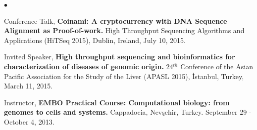 \documentclass[margin,line]{res}
\newenvironment{list2}{
  \begin{list}{$\bullet$}{%
      \setlength{\itemsep}{0.1cm}
      \setlength{\parsep}{0in} \setlength{\parskip}{0in}
      \setlength{\topsep}{0in} \setlength{\partopsep}{0in} 
      \setlength{\leftmargin}{0.2in}}}{\end{list}}
\newcommand{\junk}[1]{}
\begin{document}
\begin{resume}
\begin{list2}
{\item
  Conference Talk, 
  {\bf Coinami: A cryptocurrency with DNA Sequence Alignment as Proof-of-work.}
  High Throughput Sequencing Algorithms and Applications (HiTSeq 2015), Dublin, Ireland, July 10, 2015.
}


\junk{
\item
  Invited Speaker, 
  {\bf Discovery of large genomic inversions using pooled clone sequencing.}
  İzmir Biomedicine and Genome Center, Dokuz Eylül University, İzmir, Turkey, April 20, 2015.
  
  }
\item
  Invited Speaker, 
  {\bf High throughput sequencing and bioinformatics for characterization of diseases of genomic origin.}
  24$^{th}$ Conference of the Asian Pacific Association for the Study of the Liver (APASL 2015), İstanbul, Turkey, March 11, 2015.
  
\junk{
\item
  Invited Speaker, 
  {\bf Genetik Hastalıkların Karakterizasyonunda Yüksek Ölçekli Dizileme ve Biyoenformatik.} {\it (in Turkish)},
  İzmir Biomedicine and Genome Center, Dokuz Eylül University, İzmir, Turkey, October 8, 2014

\item
  Invited Speaker, 
  {\bf Characterization of  genome structural variation and large inversions using NGS.}
  IU Bioinformatics Clinic, July 17, 2014. 

\item
  Conference Talk, 
  {\bf Characterization of large inversions using pooled clone sequencing.}
  European Molecular Biology Organization, Young Investigator Meeting, Heidelberg, Germany, May 14-16, 2014.


\item
  Invited Lecturer, 
  {\bf Characterization of mobile element insertions using NGS.}
  ALLBIO Course on Next Generation Sequencing (NGS) methods for identification of mutations and large structural variants,
  Lausanne, Switzerland, March 11-12, 2014.
\item
  Invited Speaker, 
  {\bf  Next-generation sequence characterization of complex genome structural variation.}
  İzmir Biomedicine and Genome Center, Dokuz Eylül University, İzmir, Turkey, October 8, 2014.
}

\item 
  Instructor,
  {\bf EMBO Practical Course: Computational biology: from genomes to cells and systems.}
  Cappadocia, Nevşehir, Turkey. September 29 - October 4, 2013.
 

\end{list2}
\end{resume}
\end{document}
